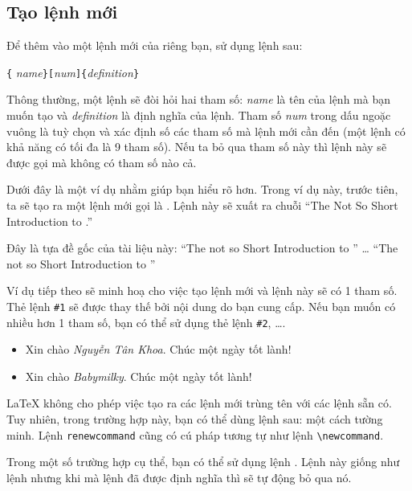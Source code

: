 \subsection{Tạo lệnh mới}
Để thêm vào một lệnh mới của riêng bạn, sử dụng lệnh sau:

\begin{lscommand}
\verb|{|%
       \emph{name}\verb|}[|\emph{num}\verb|]{|\emph{definition}\verb|}|
\end{lscommand}
\noindent Thông thường, một lệnh sẽ đòi hỏi hai tham số: \emph{name} là tên của lệnh mà bạn muốn tạo và \emph{definition} là định nghĩa của lệnh. Tham số \emph{num} trong dấu ngoặc vuông là tuỳ chọn và xác định số các tham số mà lệnh mới cần đến (một lệnh có khả năng có tối đa là 9 tham số). Nếu ta bỏ qua tham số này thì lệnh này sẽ được gọi mà không có tham số nào cả.

Dưới đây là một ví dụ nhằm giúp bạn hiểu rõ hơn. Trong ví dụ này, trước tiên, ta sẽ tạo ra một lệnh mới gọi là . Lệnh này sẽ xuất ra chuỗi ``The Not So Short Introduction to \LaTeXe{}.''

\begin{example}
\newcommand{\tnss}{The not
    so Short Introduction to
    \LaTeXe}
Đây là tựa đề gốc của tài
liệu này: ``\tnss'' \ldots{}
``\tnss''
\end{example}
Ví dụ tiếp theo sẽ minh hoạ cho việc tạo lệnh mới và lệnh này sẽ có 1 tham số. Thẻ lệnh \verb|#1| sẽ được thay thế bởi nội dung do bạn cung cấp. Nếu bạn muốn có nhiều hơn 1 tham số, bạn có thể sử dụng thẻ lệnh \verb|#2|, \ldots.

\begin{example}
\newcommand{\txsit}[1]
 {Xin chào
 \emph{#1}. Chúc một ngày tốt lành!}
\begin{itemize}
\item \txsit{Nguyễn Tân Khoa}
\item \txsit{Babymilky}
\end{itemize}
\end{example}
\LaTeX{} không cho phép việc tạo ra các lệnh mới trùng tên với các lệnh sẵn có. Tuy nhiên, trong trường hợp này, bạn có thể dùng lệnh sau:  một cách tường minh. Lệnh \verb|renewcommand| cũng có cú pháp tương tự như lệnh \verb|\newcommand|.

Trong một số trường hợp cụ thể, bạn có thể sử dụng lệnh . Lệnh này giống như lệnh  nhưng khi mà lệnh đã được định nghĩa thì \LaTeXe{} sẽ tự động bỏ qua nó.

